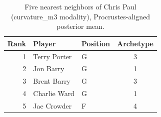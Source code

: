 \begin{table}[htbp]
  \centering\small
  \begin{tabular}{rllc}
    \toprule
    Rank & Player & Position & Archetype \\
    \midrule
    1 & Terry Porter & G & 3 \\
    2 & Jon Barry & G & 1 \\
    3 & Brent Barry & G & 3 \\
    4 & Charlie Ward & G & 1 \\
    5 & Jae Crowder & F & 4 \\
    \bottomrule
  \end{tabular}
  \caption{Five nearest neighbors of Chris Paul (curvature_m3 modality), Procrustes-aligned posterior mean.}
  \label{tab:Chris_Paul_neighbors_curvature_m3}
\end{table}

